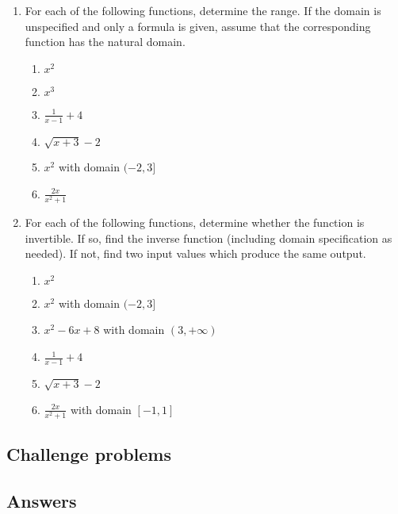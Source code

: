 \begin{enumerate}
\begin{enumerate}
\end{enumerate}
\item For each of the following functions, determine the range. If the domain is unspecified and only a formula is given, assume that the corresponding function has the natural domain.
\begin{enumerate}
\item $x^2$
\item $x^3$
\item $\frac{1}{x - 1} + 4$
\item $\sqrt{x + 3} - 2$
\item $x^2$ with domain $(-2,3]$
\item $\frac{2x}{x^2 + 1}$
\end{enumerate}
\item For each of the following functions, determine whether the function is invertible. If so, find the inverse function (including domain specification as needed). If not, find two input values which produce the same output.
\begin{enumerate}
\item $x^2$
\item $x^2$ with domain $(-2,3]$
\item $x^2 - 6x + 8$ with domain $(3, +\infty)$
\item $\frac{1}{x - 1} + 4$
\item $\sqrt{x + 3} - 2$
\item $\frac{2x}{x^2 + 1}$ with domain $[-1,1]$
\end{enumerate}
\end{enumerate}


\subsection{Challenge problems}


\newpage
\subsection{Answers}